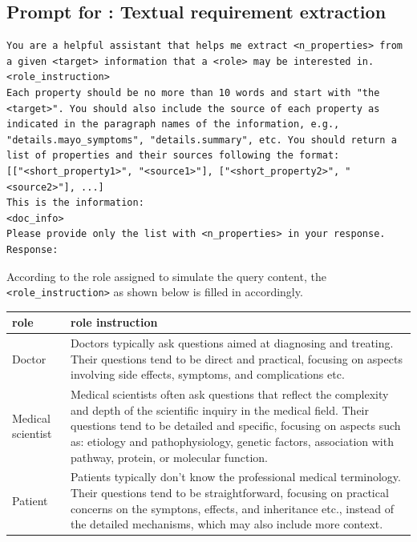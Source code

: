 \begin{mdframed}[backgroundcolor=lime!10, linecolor=black, linewidth=2pt, innerleftmargin=10pt, innerrightmargin=10pt, innertopmargin=3pt, innerbottommargin=10pt]
\section*{Prompt for \primekgt: Textual requirement extraction}
\begin{lstlisting}
You are a helpful assistant that helps me extract <n_properties> from a given <target> information that a <role> may be interested in. 
<role_instruction> 
Each property should be no more than 10 words and start with "the <target>". You should also include the source of each property as indicated in the paragraph names of the information, e.g., "details.mayo_symptoms", "details.summary", etc. You should return a list of properties and their sources following the format:
[["<short_property1>", "<source1>"], ["<short_property2>", "<source2>"], ...]
This is the information:
<doc_info>
Please provide only the list with <n_properties> in your response. Response:
\end{lstlisting}
\end{mdframed}

According to the role assigned to simulate the query content, the \texttt{<role\_instruction>} as shown below is filled in accordingly.
\begin{table}[h]
\centering
\begin{tabularx}{\textwidth}{lX}
\toprule
role          & role instruction\\
\midrule
 Doctor & {Doctors typically ask questions aimed at diagnosing and treating. Their questions tend to be direct and practical, focusing on aspects involving side effects, symptoms, and complications etc.}\\
 \noalign{\vspace{1.5ex}}
 Medical scientist & {Medical scientists often ask questions that reflect the complexity and depth of the scientific inquiry in the medical field. Their questions tend to be detailed and specific, focusing on aspects such as: etiology and pathophysiology, genetic factors, association with pathway, protein, or molecular function. }\\
 \noalign{\vspace{1.5ex}}
 Patient & {Patients typically don't know the professional medical terminology. Their questions tend to be straightforward, focusing on practical concerns on the symptons, effects, and inheritance etc., instead of the detailed mechanisms, which may also include more context. }\\
\bottomrule
\end{tabularx}
\end{table}


